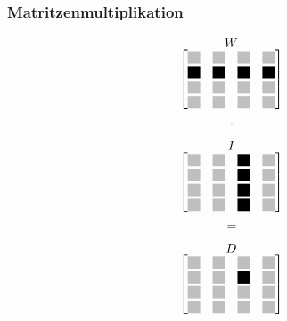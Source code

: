 \begin{frame}\frametitle{Matritzenmultiplikation}
 \begin{center}
 
\begin{minipage}{0.2\textwidth}
 \begingroup
 \renewcommand*{\arraystretch}{0.8} %
 \renewcommand*{\arraycolsep}{0.8pt} %

 \[
  \stackrel{\mbox{$W$}}{
   \begin{bmatrix}
    \myLightgrayBox 	& \myLightgrayBox 	& \myLightgrayBox 	& \myLightgrayBox \\
    \myBlackBox 	& \myBlackBox 		& \myBlackBox 		& \myBlackBox \\
    \myLightgrayBox 	& \myLightgrayBox	& \myLightgrayBox	& \myLightgrayBox \\
    \myLightgrayBox 	& \myLightgrayBox 	& \myLightgrayBox 	& \myLightgrayBox 
   \end{bmatrix}
  }
 \]
 \endgroup
\end{minipage}
\begin{minipage}{0.05\textwidth}
 \[
  \cdot
 \]
\end{minipage}
\begin{minipage}{0.2\textwidth}
 \begingroup
 \renewcommand*{\arraystretch}{0.8} %
 \renewcommand*{\arraycolsep}{0.8pt} %

 \[
  \stackrel{\mbox{$I$}}{
   \begin{bmatrix}
    \myLightgrayBox 	& \myLightgrayBox	& \myBlackBox   & \myLightgrayBox \\
    \myLightgrayBox 	& \myLightgrayBox 	& \myBlackBox 	& \myLightgrayBox \\
    \myLightgrayBox 	& \myLightgrayBox	& \myBlackBox	& \myLightgrayBox \\
    \myLightgrayBox 	& \myLightgrayBox 	& \myBlackBox	& \myLightgrayBox 
   \end{bmatrix}
  }
 \]
 \endgroup
\end{minipage}
\begin{minipage}{0.05\textwidth}
 \[
  =
 \]
\end{minipage}
\begin{minipage}{0.2\textwidth}
\begingroup
\renewcommand*{\arraystretch}{0.8} %
\renewcommand*{\arraycolsep}{0.8pt} %
\[
  \stackrel{\mbox{$D$}}{
   \begin{bmatrix}
     \myLightgrayBox	& \myLightgrayBox 	& \myLightgrayBox 	& \myLightgrayBox \\
    \myLightgrayBox 	& \myLightgrayBox 	& \myBlackBox		& \myLightgrayBox \\
    \myLightgrayBox 	& \myLightgrayBox 	& \myLightgrayBox 	& \myLightgrayBox \\
    \myLightgrayBox 	& \myLightgrayBox 	& \myLightgrayBox 	& \myLightgrayBox 
   \end{bmatrix}
   }
 \]
 

\end{minipage}
\end{center}
\end{frame}
